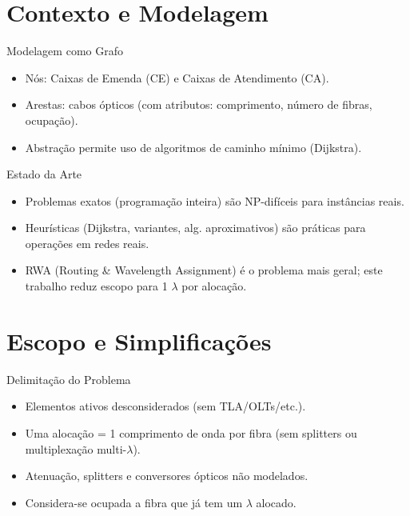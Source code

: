 \documentclass[aspectratio=169,xcolor=dvipsnames]{beamer}
\begin{document}
\section{Contexto e Modelagem}
\begin{frame}{Modelagem como Grafo}
  \begin{itemize}
    \item Nós: Caixas de Emenda (CE) e Caixas de Atendimento (CA).
    \item Arestas: cabos ópticos (com atributos: comprimento, número de fibras, ocupação).
    \item Abstração permite uso de algoritmos de caminho mínimo (Dijkstra).
  \end{itemize}
\end{frame}

\begin{frame}{Estado da Arte}
  \begin{itemize}
    \item Problemas exatos (programação inteira) são NP-difíceis para instâncias reais.
    \item Heurísticas (Dijkstra, variantes, alg. aproximativos) são práticas para operações em redes reais.
    \item RWA (Routing \& Wavelength Assignment) é o problema mais geral; este trabalho reduz escopo para 1 $\lambda$ por alocação.
  \end{itemize}
\end{frame}

\section{Escopo e Simplificações}
\begin{frame}{Delimitação do Problema}
  \begin{itemize}
    \item Elementos ativos desconsiderados (sem TLA/OLTs/etc.).
    \item Uma alocação = 1 comprimento de onda por fibra (sem splitters ou multiplexação multi-$\lambda$).
    \item Atenuação, splitters e conversores ópticos não modelados.
    \item Considera-se ocupada a fibra que já tem um $\lambda$ alocado.
  \end{itemize}
\end{frame}
\end{document}
